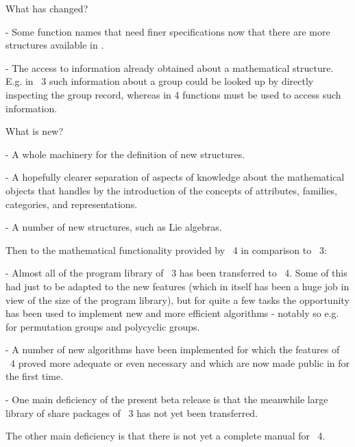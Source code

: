 What has changed? 

\beginlist
  \item{-}
    Some function names that need finer specifications now that there are
    more structures available in {\GAP}.

  \item{-}
    The access to  information   already obtained about  a   mathematical
    structure.  E.g.  in {\GAP}~3 such information about a group could be
    looked up by directly inspecting the  group record, whereas in {\GAP}
    4 functions must be used to access such information.
\endlist

What is new?

\beginlist
  \item{-}
    A whole machinery for the definition of new structures. 

  \item{-}
    A  hopefully  clearer separation of  aspects  of knowledge  about the
    mathematical objects that {\GAP} handles  by the introduction of  the
    concepts of attributes, families, categories, and representations.

  \item{-}
    A number of new structures, such as  Lie algebras.
\enditems

Then to the mathematical functionality provided by {\GAP}~4 in comparison
to {\GAP}~3:

\beginlist
  \item{-}
    Almost all of the program library of {\GAP}~3 has been transferred to
    {\GAP}~4.   Some of this had  just to be adapted to  the new features
    (which in  itself has been  a huge  job in view   of the size  of the
    program library), but for quite a  few tasks the opportunity has been
    used to implement new and more efficient algorithms - notably so e.g.
    for permutation groups and polycyclic groups.

  \item{-}
    A number    of new algorithms  have  been  implemented for  which the
    features of {\GAP}~4 proved more adequate or even necessary and which
    are now made public in {\GAP} for the first time.

  \item{-}
    One main deficiency of the present beta release is that the meanwhile
    large   library of share  packages  of   {\GAP}~3  has not  yet  been
    transferred.
\endlist

The other main deficiency is that there is not yet  a complete manual for
{\GAP}~4.


